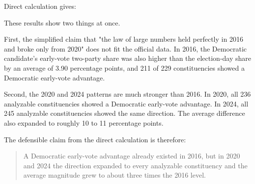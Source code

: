 \documentclass[preprint]{../ieie/IEIE}
\begin{document}
Direct calculation gives:

\begin{center}
\scriptsize
{}
\end{center}

These results show two things at once.

First, the simplified claim that "the law of large numbers held perfectly in 2016 and broke only from 2020" does not fit the official data. In 2016, the Democratic candidate's early-vote two-party share was also higher than the election-day share by an average of 3.90 percentage points, and 211 of 229 constituencies showed a Democratic early-vote advantage.

Second, the 2020 and 2024 patterns are much stronger than 2016. In 2020, all 236 analyzable constituencies showed a Democratic early-vote advantage. In 2024, all 245 analyzable constituencies showed the same direction. The average difference also expanded to roughly 10 to 11 percentage points.

The defensible claim from the direct calculation is therefore:

\begin{quote}
A Democratic early-vote advantage already existed in 2016, but in 2020 and 2024 the direction expanded to every analyzable constituency and the average magnitude grew to about three times the 2016 level.
\end{quote}
\end{document}
